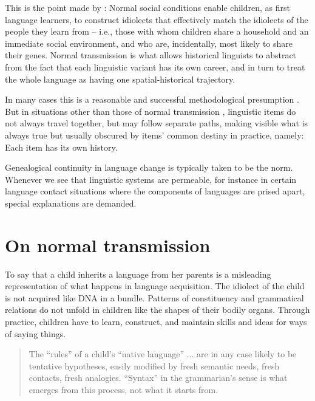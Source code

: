 This is the point made by \citet{thomason_language_1988}: Normal social 
conditions enable children, as first language learners, to construct 
idiolects that effectively match the idiolects of the people they learn 
from -- i.e., those with whom children share a household and an immediate social 
environment, and who are, incidentally, most likely to share their 
genes. Normal transmission is what allows historical linguists to 
abstract from the fact that each linguistic variant has its own career, 
and in turn to treat the whole language as having one 
spatial-historical trajectory.



In many cases this is a reasonable and successful methodological 
presumption \citep{haspelmath_how_2004}. But in 
situations other than those of normal transmission \citep{le_page_acts_1985,thomason_language_1988}, linguistic items do 
not always travel together, but may follow separate paths, making 
visible what is always true but usually obscured by items' common 
destiny in practice, namely: Each item has its own history. 



Genealogical continuity in language change is typically taken to be the 
norm. Whenever we see that linguistic systems are permeable, for instance in certain language contact situations where the 
components of languages are prised apart, special explanations are 
demanded. 

\section{On normal transmission}

To say that a child inherits a language from her parents is a misleading representation of what happens in language acquisition. The idiolect of the child is not acquired like DNA in a bundle. Patterns of constituency and grammatical relations do not unfold in children like the shapes of their bodily organs. Through practice, children have to learn, construct, and maintain skills and ideas for ways of saying things. 

\begin{quotation}
The ``rules'' of a child's ``native language'' ... are in any case likely to be tentative hypotheses, easily modified by fresh semantic needs, fresh contacts, fresh analogies. ``Syntax'' in the grammarian's sense is what emerges from this process, not what it starts from. \citep[190]{le_page_acts_1985} 
\end{quotation}

